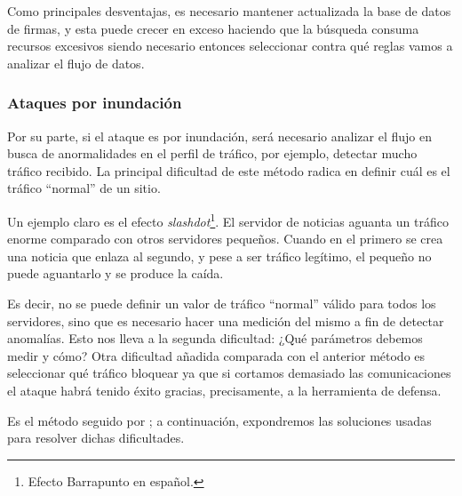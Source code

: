 Como principales desventajas, es necesario mantener actualizada la base de datos de firmas, y esta
puede crecer en exceso haciendo que la búsqueda consuma recursos excesivos siendo necesario entonces
seleccionar contra qué reglas vamos a analizar el flujo de datos.

\subsubsection{Ataques por inundación}\label{sssec:ddos_deteccion_inundacion}
Por su parte, si el ataque es por inundación, será necesario analizar el flujo en busca de anormalidades
en el perfil de tráfico, por ejemplo, detectar mucho tráfico recibido. La principal dificultad de este método radica
en definir cuál es el tráfico ``normal'' de un sitio.

Un ejemplo claro es el efecto \emph{slashdot}\footnote{Efecto Barrapunto en español.}. El servidor de noticias
aguanta un tráfico enorme comparado con otros servidores pequeños. Cuando en el primero se crea una noticia que
enlaza al segundo, y pese a ser tráfico legítimo, el pequeño no puede aguantarlo y se produce la caída.

Es decir, no se puede definir un valor de tráfico ``normal'' válido para todos los servidores, sino que es
necesario hacer una medición del mismo a fin de detectar anomalías. Esto nos lleva a la segunda dificultad:
¿Qué parámetros debemos medir y cómo? Otra dificultad añadida comparada con el anterior método es 
seleccionar qué tráfico bloquear ya
que si cortamos demasiado las comunicaciones el ataque habrá tenido éxito gracias, precisamente, a la herramienta de defensa.

Es el método seguido por \redborderddos; a continuación, expondremos las soluciones usadas para 
resolver dichas dificultades.

\endinput
